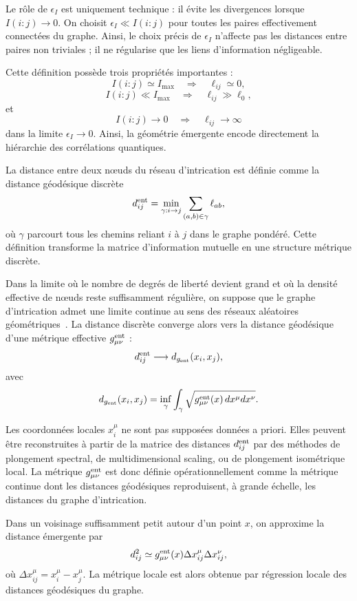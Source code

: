 \documentclass[11pt]{article}
\begin{document}
Le r\^ole de $\epsilon_I$ est uniquement technique : il \'evite les divergences lorsque
$I(i:j)\rightarrow0$. On choisit $\epsilon_I \ll I(i:j)$ pour toutes les paires
effectivement connect\'ees du graphe. Ainsi, le choix pr\'ecis de $\epsilon_I$
n'affecte pas les distances entre paires non triviales ; il ne r\'egularise que les
liens d'information n\'egligeable.

Cette d\'efinition poss\`ede trois propri\'et\'es importantes :
\[
I(i:j)\simeq I_{\max}
\quad\Longrightarrow\quad
\ell_{ij}\simeq 0,
\]
\[
I(i:j)\ll I_{\max}
\quad\Longrightarrow\quad
\ell_{ij}\gg \ell_0,
\]
et
\[
I(i:j)\rightarrow 0
\quad\Longrightarrow\quad
\ell_{ij}\rightarrow \infty
\]
dans la limite $\epsilon_I\rightarrow0$. Ainsi, la g\'eom\'etrie \'emergente encode
directement la hi\'erarchie des corr\'elations quantiques.

La distance entre deux n\oe{}uds du r\'eseau d'intrication est d\'efinie comme la
distance g\'eod\'esique discr\`ete
\[
d_{ij}^{\rm ent}
=
\min_{\gamma:i\rightarrow j}
\sum_{(a,b)\in\gamma}
\ell_{ab},
\]
o\`u $\gamma$ parcourt tous les chemins reliant $i$ \`a $j$ dans le graphe pond\'er\'e.
Cette d\'efinition transforme la matrice d'information mutuelle en une structure
m\'etrique discr\`ete.

Dans la limite o\`u le nombre de degr\'es de libert\'e devient grand et o\`u la densit\'e
effective de n\oe{}uds reste suffisamment r\'eguli\`ere, on suppose que le graphe
d'intrication admet une limite continue au sens des r\'eseaux al\'eatoires
g\'eom\'etriques~\cite{penrose2003}. La distance discr\`ete converge alors vers la
distance g\'eod\'esique d'une m\'etrique effective $g_{\mu\nu}^{\rm ent}$ :
\[
d_{ij}^{\rm ent}
\longrightarrow
d_{g_{\rm ent}}(x_i,x_j),
\]
avec
\[
d_{g_{\rm ent}}(x_i,x_j)
=
\inf_{\gamma}
\int_{\gamma}
\sqrt{
g_{\mu\nu}^{\rm ent}(x)\,
dx^\mu dx^\nu
}.
\]

Les coordonn\'ees locales $x_i^\mu$ ne sont pas suppos\'ees donn\'ees a priori. Elles
peuvent \^etre reconstruites \`a partir de la matrice des distances $d_{ij}^{\rm ent}$
par des m\'ethodes de plongement spectral, de multidimensional scaling, ou de
plongement isom\'etrique local. La m\'etrique $g_{\mu\nu}^{\rm ent}$ est donc d\'efinie
op\'erationnellement comme la m\'etrique continue dont les distances g\'eod\'esiques
reproduisent, \`a grande \'echelle, les distances du graphe d'intrication.

Dans un voisinage suffisamment petit autour d'un point $x$, on approxime la
distance \'emergente par
\[
d_{ij}^{2}
\simeq
g_{\mu\nu}^{\rm ent}(x)
\Delta x_{ij}^{\mu}
\Delta x_{ij}^{\nu},
\]
o\`u $\Delta x_{ij}^{\mu}=x_i^\mu-x_j^\mu$. La m\'etrique locale est alors obtenue
par r\'egression locale des distances g\'eod\'esiques du graphe.
\end{document}
